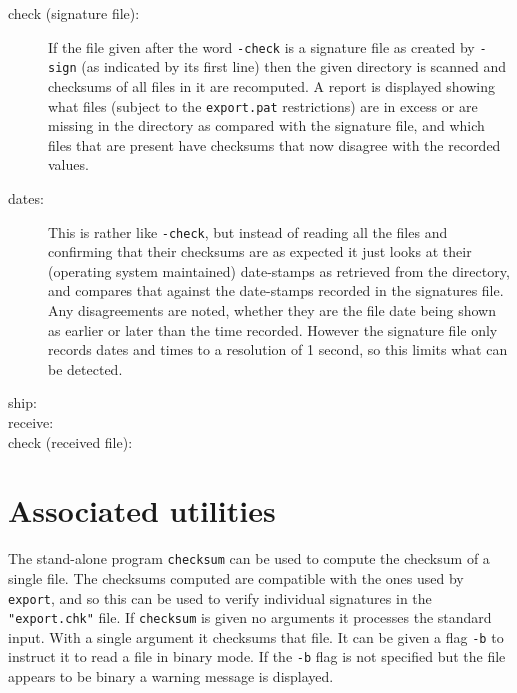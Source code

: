\begin{description}
\item[check (signature file):] If the file given after the word {\tt -check}
is a signature file as created by {\tt -sign} (as indicated by its
first line) then the given directory is scanned and checksums of all
files in it are recomputed. A report is displayed showing what files
(subject to the {\tt export.pat} restrictions) are in excess or are missing
in the directory as compared with the signature file, and which files
that are present have checksums that now disagree with the recorded values.

\item[dates:] This is rather like {\tt -check}, but instead of reading all
the files and confirming that their checksums are as expected it just
looks at their (operating system maintained) date-stamps as retrieved
from the directory, and compares that against the date-stamps recorded
in the signatures file.  Any disagreements are noted, whether they are
the file date being shown as earlier or later than the time recorded. However
the signature file only records dates and times to a resolution of 1 second,
so this limits what can be detected.
\item[ship:]
\item[receive:]
\item[check (received file):]
\end{description}

\section{Associated utilities}
The stand-alone program {\tt checksum} can be used to compute the
checksum of a single file.  The checksums computed are compatible with the
ones used by {\tt export}, and so this can be used to verify individual
signatures in the {\tt "export.chk"} file.  If {\tt checksum} is given no
arguments it processes the standard input.  With a single argument it
checksums that file.  It can be given a flag {\tt -b} to instruct it
to read a file in binary mode. If the {\tt -b} flag is not specified but
the file appears to be binary a warning message is displayed.

